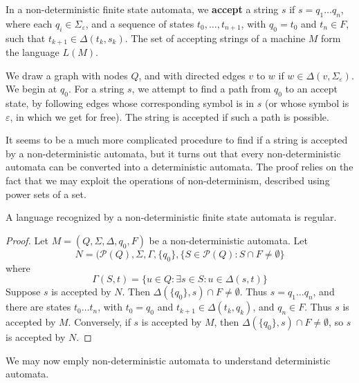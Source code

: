 \begin{definition}
    In a non-deterministic finite state automata, we {\bf accept} a string $s$ if $s = q_1 \dots q_n$, where each $q_i \in \Sigma_\varepsilon$, and a sequence of states $t_0, \dots, t_{n+1}$, with $q_0 = t_0$ and $t_n \in F$, such that $t_{k+1} \in \Delta(t_k, s_k)$. The set of accepting strings of a machine $M$ form the language $L(M)$.
\end{definition}

We draw a graph with nodes $Q$, and with directed edges $v$ to $w$ if $w \in \Delta(v, \Sigma_{\varepsilon})$. We begin at $q_0$. For a string $s$, we attempt to find a path from $q_0$ to an accept state, by following edges whose corresponding symbol is in $s$ (or whose symbol is $\varepsilon$, in which we get for free). The string is accepted if such a path is possible.

It seems to be a much more complicated procedure to find if a string is accepted by a non-deterministic automata, but it turns out that every non-deterministic automata can be converted into a deterministic automata. The proof relies on the fact that we may exploit the operations of non-determinism, described using power sets of a set.

\begin{theorem}
    A language recognized by a non-deterministic finite state automata is regular.
\end{theorem}
\begin{proof}
    Let $M = (Q, \Sigma, \Delta, q_0, F)$ be a non-deterministic automata. Let
    \[ N = (\mathcal{P}(Q), \Sigma, \Gamma, \{ q_0 \}, \{ S \in \mathcal{P}(Q) : S \cap F \neq \emptyset \} \]
    where
    \[ \Gamma(S, t) = \{ u \in Q : \exists s \in S : u \in \Delta(s,t) \} \]
    Suppose $s$ is accepted by $N$. Then $\Delta(\{ q_0 \}, s) \cap F \neq \emptyset$. Thus $s = q_1 \dots q_n$, and there are states $t_0 \dots t_n$, with $t_0 = q_0$ and $t_{k+1} \in \Delta(t_k, q_k)$, and $q_n \in F$. Thus $s$ is accepted by $M$. Conversely, if $s$ is accepted by $M$, then $\Delta(\{ q_0 \}, s) \cap F \neq \emptyset$, so $s$ is accepted by $N$.
\end{proof}

We may now emply non-deterministic automata to understand deterministic automata.


